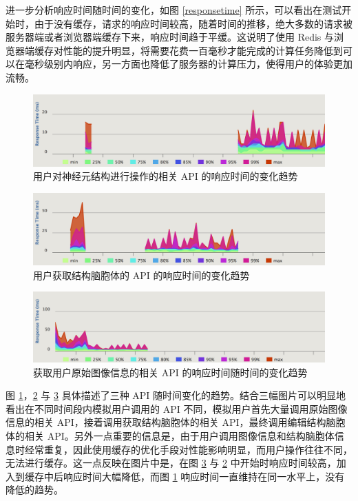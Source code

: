 进一步分析响应时间随时间的变化，如图 \ref{responsetime} 所示，可以看出在测试开始时，由于没有缓存，请求的响应时间较高，随着时间的推移，绝大多数的请求被服务器端或者浏览器端缓存下来，响应时间趋于平缓。这说明了使用 Redis 与浏览器端缓存对性能的提升明显，将需要花费一百毫秒才能完成的计算任务降低到可以在毫秒级别内响应，另一方面也降低了服务器的计算压力，使得用户的体验更加流畅。

\begin{figure}[!ht]
\centering
\includegraphics[width=148mm]{images/operation-res}
\caption{用户对神经元结构进行操作的相关 API 的响应时间的变化趋势}
\label{operation-res}
\end{figure}

\begin{figure}[!ht]
\centering
\includegraphics[width=148mm]{images/swc-c-res}
\caption{用户获取结构脑胞体的 API 的响应时间的变化趋势}
\label{swc-c-res}
\end{figure}

\begin{figure}[!ht]
\centering
\includegraphics[width=148mm]{images/image-res}
\caption{获取用户原始图像信息的相关 API 的响应时间随时间的变化趋势}
\label{image-res}
\end{figure}

图 \ref{operation-res}，\ref{swc-c-res} 与 \ref{image-res} 具体描述了三种 API 随时间变化的趋势。结合三幅图片可以明显地看出在不同时间段内模拟用户调用的 API 不同，模拟用户首先大量调用原始图像信息的相关 API，接着调用获取结构脑胞体的相关 API，最终调用编辑结构脑胞体的相关 API。另外一点重要的信息是，由于用户调用图像信息和结构脑胞体信息时经常重复，因此使用缓存的优化手段对性能影响明显，而用户操作往往不同，无法进行缓存。这一点反映在图片中是，在图 \ref{image-res} 与 \ref{swc-c-res} 中开始时响应时间较高，加入到缓存中后响应时间大幅降低，而图 \ref{operation-res} 响应时间一直维持在同一水平上，没有降低的趋势。

